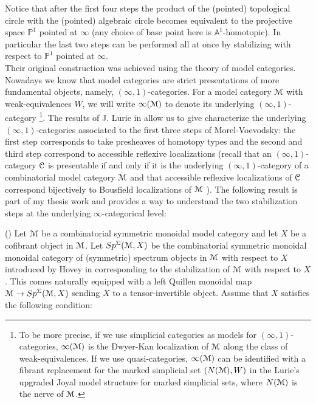\begin{refsection}
Notice that after the first four steps the product of the (pointed) topological circle with the (pointed) algebraic circle becomes equivalent to the projective space $\mathbb{P}^1$ pointed at $\infty$ (any choice of base point here is $\mathbb{A}^1$-homotopic). In particular the last two steps can be performed all at once by stabilizing with respect to  $\mathbb{P}^1$ pointed at $\infty$.\\ 

Their original construction was achieved using the theory of model categories. Nowadays we know that model categories are strict presentations of more fundamental objects, namely, $(\infty,1)$-categories. For a model category $\mathcal{M}$ with weak-equivalences $W$, we will write $\infty(\mathcal{M})$ to denote its underlying $(\infty,1)$-category \footnote{To be more precise, if we use simplicial categories as models for $(\infty,1)$-categories, $\infty(\mathcal{M})$ is the Dwyer-Kan localization of $\mathcal{M}$ along the class of weak-equivalences. If we use quasi-categories, $\infty(\mathcal{M})$ can be identified with a fibrant replacement for the marked simplicial set $(N(\mathcal{M}), W)$ in the Lurie's upgraded Joyal model structure for marked simplicial sets, where $N(\mathcal{M})$ is the nerve of $\mathcal{M}$.}.  The results of J. Lurie in \cite{lurie-htt} allow us to give characterize the underlying $(\infty,1)$-categories associated to the first three steps of Morel-Voevodsky: the first step corresponds to take presheaves of homotopy types \cite[4.2.4.4]{lurie-htt} and the second and third step correspond to accessible reflexive localizations (recall that an $(\infty,1)$-category $\mathcal{C}$ is presentable if and only if it is the underlying $(\infty,1)$-category of a combinatorial model category $\mathcal{M}$ and that accessible reflexive localizations of $\mathcal{C}$ correspond bijectively to Bousfield localizations of $\mathcal{M}$ \cite[A.3.7.4, A.3.7.6, A.3.7.8]{lurie-htt}). The following result is part of my thesis work and provides a way to understand the two stabilization steps at the underlying $\infty$-categorical level:


\begin{thm}(\cite[4.29]{nc1})
Let $\mathcal{M}$ be a combinatorial symmetric monoidal model category and let $X$ be a cofibrant object in $\mathcal{M}$. Let $Sp^{\Sigma}(\mathcal{M}, X)$ be the combinatorial symmetric monoidal monoidal category of (symmetric) spectrum objects in $\mathcal{M}$ with respect to $X$ introduced by Hovey in \cite{hovey-spectraandsymmetricspectra} corresponding to the stabilization of $\mathcal{M}$ with respect to $X$. This comes naturally equipped with a left Quillen monoidal map $\mathcal{M}\to Sp^{\Sigma}(\mathcal{M}, X)$ sending $X$ to a tensor-invertible object. Assume that $X$ satisfies the following condition:\\


\end{thm}
\end{refsection}
